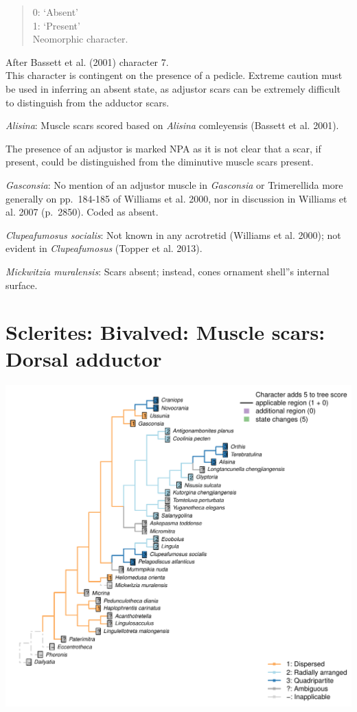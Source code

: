 \documentclass[]{book}
\theoremstyle{definition}
\theoremstyle{definition}
\theoremstyle{definition}
\theoremstyle{remark}
\begin{document}
\begin{quote}
0: `Absent'\\
1: `Present'\\
Neomorphic character.
\end{quote}

After Bassett et al. (2001) character 7.\\
This character is contingent on the presence of a pedicle. Extreme
caution must be used in inferring an absent state, as adjustor scars can
be extremely difficult to distinguish from the adductor scars.

\emph{Alisina}: Muscle scars scored based on \emph{Alisina} comleyensis
(Bassett et al. 2001).

The presence of an adjustor is marked NPA as it is not clear that a
scar, if present, could be distinguished from the diminutive muscle
scars present.

\emph{Gasconsia}: No mention of an adjustor muscle in \emph{Gasconsia}
or Trimerellida more generally on pp.~184-185 of Williams et al. 2000,
nor in discussion in Williams et al. 2007 (p.~2850). Coded as absent.

\emph{Clupeafumosus socialis}: Not known in any acrotretid (Williams et
al. 2000); not evident in \emph{Clupeafumosus} (Topper et al. 2013).

\emph{Mickwitzia muralensis}: Scars absent; instead, cones ornament
shell''s internal surface.

\hypertarget{sclerites-bivalved-muscle-scars-dorsal-adductor}{%
\section*{Sclerites: Bivalved: Muscle scars: Dorsal
adductor}\label{sclerites-bivalved-muscle-scars-dorsal-adductor}}

\includegraphics{Brachiopod_phylogeny_files/figure-latex/unnamed-chunk-5-13.pdf}
\end{document}
